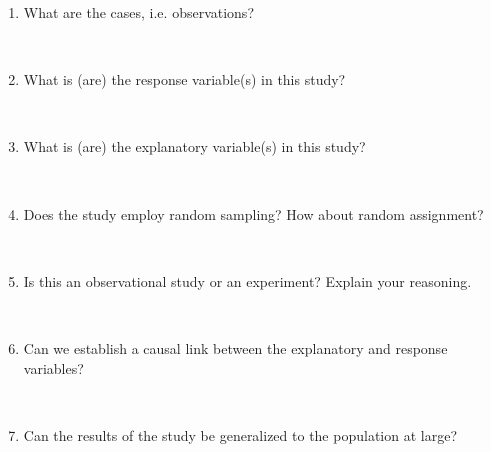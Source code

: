 \documentclass[12pt]{article}
\newcommand{\soln}[2]{$\:$\\ \vspace{#1}}{}
\begin{document}
\begin{enumerate}

\item What are the cases, i.e. observations?

\soln{1cm}{200 men and women}

\item What is (are) the response variable(s) in this study?

\soln{1cm}{Attitude towards the microwave oven}

\pagebreak

\item What is (are) the explanatory variable(s) in this study?

\soln{1cm}{Whether the participant is a hater or not}

\item Does the study employ random sampling? How about random assignment?

\soln{1cm}{Via Amazon's MTurk - self selected sample, no random assignment}

\item Is this an observational study or an experiment? Explain your reasoning.

\soln{1cm}{Observational, doesn't use random assignment}

\item Can we establish a causal link between the explanatory and response variables?

\soln{1cm}{No}

\item Can the results of the study be generalized to the population at large?

\soln{1cm}{No}

\end{enumerate}
\end{document}
